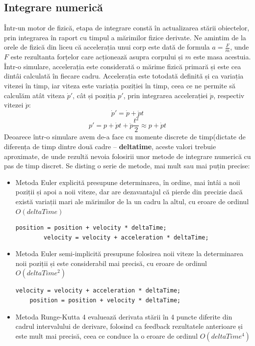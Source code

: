 \documentclass[12pt,a4paper]{report}
\begin{document}
\subsection{Integrare numerică}
Într-un motor de fizică, etapa de integrare constă în actualizarea stării obiectelor, prin integrarea în raport cu timpul a mărimilor fizice derivate. Ne amintim de la orele de fizică din liceu că accelerația unui corp este dată de formula $ a = \frac{F}{m} $, unde $F$ este rezultanta forțelor care acționează asupra corpului și $m$ este masa acestuia. Într-o simulare, accelerația este considerată o mărime fizică primară și este cea dintâi calculată în fiecare cadru. Accelerația este totodată definită și ca variația vitezei în timp, iar viteza este variația poziției în timp, ceea ce ne permite să calculăm atât viteza $\dot{p}'$, cât și poziția $p'$, prin integrarea accelerației $\ddot{p}$, respectiv vitezei $\dot{p}$:
$$ \dot{p}' = \dot{p} + \ddot{p}t $$
$$ p' = p + \dot{p}t + \ddot{p}\frac{t^2}{2} \approx p + \dot{p}t $$
Deoarece într-o simulare avem de-a face cu momente discrete de timp(dictate de diferența de timp dintre două cadre -- \textbf{deltatime}, aceste valori trebuie aproximate, de unde rezultă nevoia folosirii unor metode de integrare numerică cu pas de timp discret.
Se disting o serie de metode, mai mult sau mai puțin precise\cite{integration_gaffer}:
\begin{itemize}
	\item Metoda Euler explicită presupune determinarea, în ordine, mai întâi a noii poziții și apoi a noii viteze, dar are dezavantajul că pierde din precizie dacă există variații mari ale mărimilor de la un cadru la altul, cu eroare de ordinul $O(deltaTime)$
	\begin{lstlisting}[style=myC++]
		position = position + velocity * deltaTime;
		velocity = velocity + acceleration * deltaTime;
	\end{lstlisting}
	\item Metoda Euler semi-implicită presupune folosirea noii viteze la determinarea noii poziții și este considerabil mai precisă, cu eroare de ordinul $O(deltaTime^2)$
	\begin{lstlisting}[style=myC++]
	velocity = velocity + acceleration * deltaTime;
	position = position + velocity * deltaTime;
	\end{lstlisting}
	\item Metoda Runge-Kutta 4 evaluează derivata stării în 4 puncte diferite din cadrul intervalului de derivare, folosind ca feedback rezultatele anterioare și este mult mai precisă, ceea ce conduce la o eroare de ordinul $O(deltaTime^4)$
\end{itemize}
\end{document}
